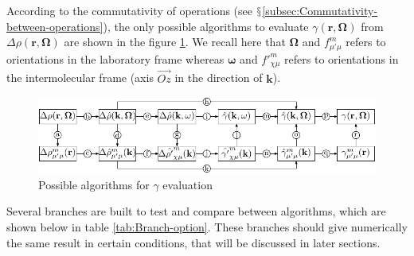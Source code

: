 According to the commutativity of operations (see $\mathsection$\ref{subsec:Commutativity-between-operations}),
the only possible algorithms to evaluate $\gamma(\mathbf{r},\mathbf{\Omega})$
from $\Delta\rho(\mathbf{r},\mathbf{\Omega})$ are shown in the figure
\ref{fig:Possible-algorithms}. We recall here that $\mathbf{\Omega}$
and $f_{\mu'\mu}^{m}$ refers to orientations in the laboratory frame
whereas $\boldsymbol{\omega}$ and ${f'}_{\chi\mu}^{m}$ refers to
orientations in the intermolecular frame (axis $\overrightarrow{Oz}$
in the direction of $\mathbf{k}$).

\begin{figure}[h]
\begin{centering}
\includegraphics{_figure/algorithms}
\par\end{centering}
\caption{Possible algorithms for $\gamma$ evaluation\label{fig:Possible-algorithms}}
\end{figure}

Several branches are built to test and compare between algorithms,
which are shown below in table \ref{tab:Branch-option}. These branches
should give numerically the same result in certain conditions, that
will be discussed in later sections. 

